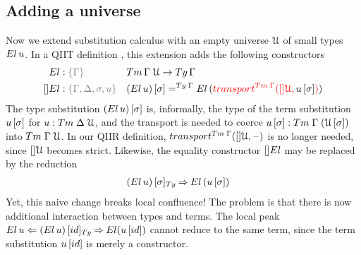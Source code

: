 \documentclass[a4paper,UKenglish,numberwithinsect,cleveref,thm-restate]{lipics-v2021}
\begin{document}
\subsection{Adding a universe} \label{subsec:SC+U}
Now we extend substitution calculus with an empty universe $\mathcal{U}$ of small types~$\El\,u$.
In a QIIT definition \cite{Altenkirch2016a}, this extension adds the following constructors
\begin{alignat*}{3}
  \El   & : \implicit{\Gamma} && \Tm\,\Gamma\;\UU \to \Ty\,\Gamma \\
  []\El & : \implicit{\Gamma, \Delta, \sigma, u} && \sub{(\El\, u)}{\sigma} =^{\Ty\;\Gamma} \El\,(\alert{\transfib{\Tm\;\Gamma}{[]\UU}{\color{black}\sub{u}{\sigma}}})
\end{alignat*}
The type substitution $\sub{(\El\,u)}{\sigma}$ is, informally, the type of the term substitution ${u}\,[\sigma]$ for $u : \Tm\;\Delta\;\UU$, and the transport is needed to coerce $\sub{u}{\sigma} : \Tm\;\Gamma\;(\sub{\UU}{\sigma})$ into $\Tm\;\Gamma\;\UU$.
%
In our QIIR definition, $\transfib{\Tm\;\Gamma}{[]\UU}{\blank}$ is no longer needed, since $[]\mathcal{U}$ becomes strict. 
Likewise, the equality constructor $[]\El$ may be replaced by the reduction
\begin{alignat*}{3}
  \subTy{(\El\, u)}{\sigma} & \reduce \El\,(\sub{u}{\sigma})
\end{alignat*}
Yet, this naive change breaks local confluence!
The problem is that there is now additional interaction between types and terms.
The local peak
\(
  \El\,u \Leftarrow \subTy{(\El\,u)}{\idS} \reduce \El(\sub{u}{\idS})
\)
cannot reduce to the same term, since the term substitution $\sub{u}{\idS}$ is merely a constructor.
%
\end{document}
